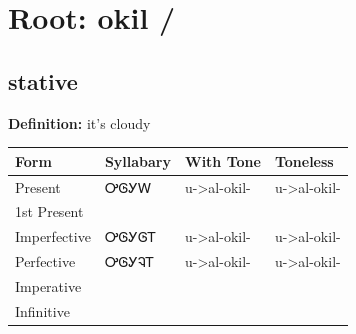 \documentclass{article}%
\begin{document}
%
\normalsize%
\section*{Root: okil / }%
\subsection*{stative}%
\textbf{Definition: }%
it’s cloudy%
\\[0.5em]%
\begin{tabular}{|l|l|l|l|}%
\hline%
\textbf{Form}&\textbf{Syllabary}&\textbf{With Tone}&\textbf{Toneless}\\%
\hline%
Present&ᎤᎶᎩᎳ&u{-}>al{-}okil{-}&u{-}>al{-}okil{-}\\%
1st Present&&&\\%
Imperfective&ᎤᎶᎩᎶᎢ&u{-}>al{-}okil{-}&u{-}>al{-}okil{-}\\%
Perfective&ᎤᎶᎩᎸᎢ&u{-}>al{-}okil{-}&u{-}>al{-}okil{-}\\%
Imperative&&&\\%
Infinitive&&&\\%
\hline%
\end{tabular}%
\\[1em]%
\end{document}

